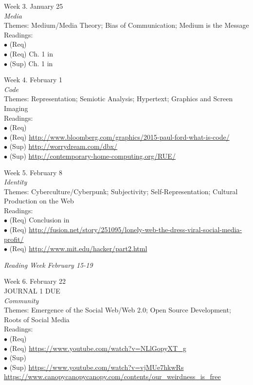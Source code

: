 \documentclass[10pt]{article}
\begin{document}
Week 3. January 25 \\
\textit{Media} \\
Themes: Medium/Media Theory; Bias of Communication; Medium is the Message \\
	Readings: \\ 
	$\bullet$ (Req) \\
	$\bullet$ (Req) Ch. 1 in \\
	$\bullet$ (Sup) Ch. 1 in 

Week 4. February 1 \\
\textit{Code} \\
Themes: Representation; Semiotic Analysis; Hypertext; Graphics and Screen Imaging \\ 
	Readings: \\
	$\bullet$ (Req) \\
	$\bullet$ (Req) \url{http://www.bloomberg.com/graphics/2015-paul-ford-what-is-code/}\\
	$\bullet$ (Sup) \url{http://worrydream.com/dbx/}\\
	$\bullet$ (Sup) \url{http://contemporary-home-computing.org/RUE/}

Week 5. February 8 \\
\textit{Identity} \\
Themes: Cyberculture/Cyberpunk; Subjectivity; Self-Representation; Cultural Production on the Web \\ 
	Readings: \\
	$\bullet$ (Req) Conclusion in \\
	$\bullet$ (Req) \url{http://fusion.net/story/251095/lonely-web-the-dress-viral-social-media-profit/}\\
	$\bullet$ (Req) \url{http://www.mit.edu/hacker/part2.html}

\textit{Reading Week February 15-19}

Week 6. February 22 \\
JOURNAL 1 DUE \\
\textit{Community} \\
Themes: Emergence of the Social Web/Web 2.0; Open Source Development; Roots of Social Media \\
	Readings: \\
	$\bullet$ (Req) \\
	$\bullet$ (Req) \url{https://www.youtube.com/watch?v=NLlGopyXT_g}\\
	$\bullet$ (Sup) \\
	$\bullet$ (Sup) \url{https://www.youtube.com/watch?v=vjMUe7hkwRs}
	\url{https://www.canopycanopycanopy.com/contents/our_weirdness_is_free}
\end{document}

